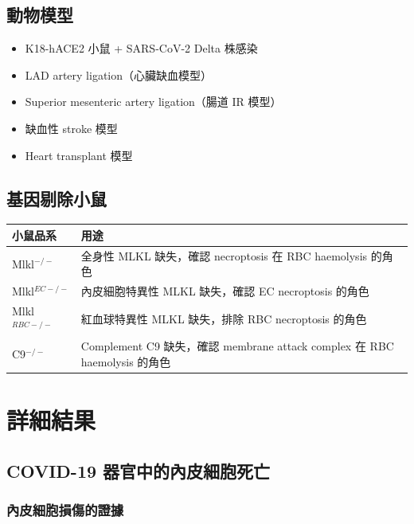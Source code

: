 \documentclass[12pt,a4paper]{article}
\begin{document}
\subsection{動物模型}

\begin{itemize}
    \item K18-hACE2 小鼠 + SARS-CoV-2 Delta 株感染
    \item LAD artery ligation（心臟缺血模型）
    \item Superior mesenteric artery ligation（腸道 IR 模型）
    \item 缺血性 stroke 模型
    \item Heart transplant 模型
\end{itemize}

\subsection{基因剔除小鼠}

\begin{longtable}{p{4cm}p{10cm}}
\toprule
\textbf{小鼠品系} & \textbf{用途} \\
\midrule
\endhead
Mlkl$^{-/-}$ & 全身性 MLKL 缺失，確認 necroptosis 在 RBC haemolysis 的角色 \\
Mlkl$^{EC-/-}$ & 內皮細胞特異性 MLKL 缺失，確認 EC necroptosis 的角色 \\
Mlkl$^{RBC-/-}$ & 紅血球特異性 MLKL 缺失，排除 RBC necroptosis 的角色 \\
C9$^{-/-}$ & Complement C9 缺失，確認 membrane attack complex 在 RBC haemolysis 的角色 \\
\bottomrule
\end{longtable}

\section{詳細結果}

\subsection{COVID-19 器官中的內皮細胞死亡}

\subsubsection{內皮細胞損傷的證據}
\end{document}
